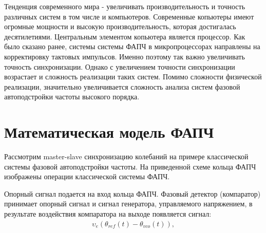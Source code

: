 \documentclass[a4paper,14pt]{article} %
\begin{document}
Тенденция современного мира - увеличивать производительность и точность различных систем в том числе и компьютеров. Современные копьютеры имеют огромные мощности и высокую производительность, которая достигалась десятилетиями. Центральным элементом копьютера является процессор. Как было сказано ранее, системы системы ФАПЧ в микропроцессорах направлены на корректировку тактовых импульсов. Именно поэтому так важно увеличивать точность синхронизации. Однако с увеличением точности синхронизации возрастает и сложность реализации таких систем. Помимо сложности физической реализации, значительно увеличивается сложность анализа систем фазовой автоподстройки частоты высокого порядка.

\newpage
\section{Математическая модель ФАПЧ}
Рассмотрим master-slave синхронизацию колебаний на примере классической системы фазовой автоподстройки частоты. На приведенной схеме кольца ФАПЧ изображены операции классической системы ФАПЧ.
\begin{center}
\end{center}
Опорный сигнал подается на вход кольца ФАПЧ. Фазовый детектор (компаратор) принимает опорный сигнал и сигнал генератора, управляемого напряжением, в результате воздействия компаратора на выходе появляется сигнал:
 \begin{equation*}
 \begin{aligned}
\upsilon_e(\theta_{ref}(t) - \theta_{vco}(t)),
 \end{aligned}
\end{equation*}
\end{document}
